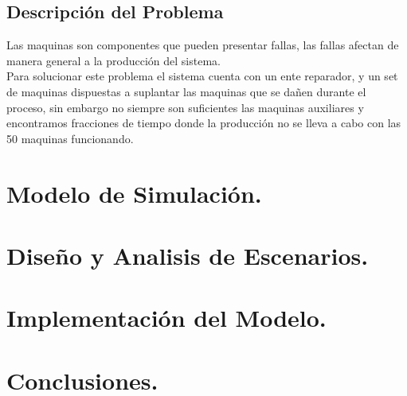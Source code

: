 \documentclass[10pt]{article}
\begin{document}
\subsection{Descripción del Problema}

Las maquinas son componentes que pueden presentar fallas, las fallas afectan de manera general a la producción del sistema.\\

Para solucionar este problema el sistema cuenta con un ente reparador, y un set de maquinas dispuestas a suplantar las maquinas que se dañen durante el proceso, sin embargo no siempre son suficientes las maquinas auxiliares y encontramos fracciones de tiempo donde la producción no se lleva a cabo con las 50 maquinas funcionando.


\section{Modelo de Simulación.}

\section{Diseño y Analisis de Escenarios.} 

\section{Implementación del Modelo.}

\section{Conclusiones.}
\end{document}
